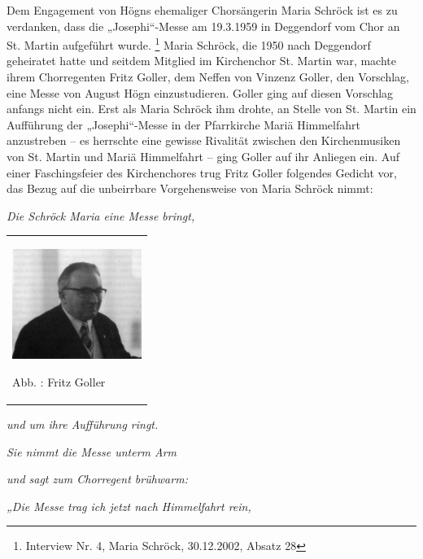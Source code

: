 \documentclass[a4paper]{article}
\newcommand\textstyleZitate[1]{\textit{#1}}
\newcounter{Abb}
\renewcommand\theAbb{\arabic{Abb}}
\begin{document}
Dem Engagement von Högns ehemaliger Chorsängerin Maria Schröck ist es zu
verdanken, dass die „Josephi“-Messe am 19.3.1959 in Deggendorf vom Chor
an St. Martin aufgeführt wurde. \footnote{Interview Nr. 4, Maria
Schröck, 30.12.2002, Absatz 28} Maria Schröck, die 1950 nach Deggendorf
geheiratet hatte und seitdem Mitglied im Kirchenchor St. Martin war,
machte ihrem Chorregenten Fritz Goller, dem Neffen von Vinzenz Goller,
den Vorschlag, eine Messe von August Högn einzustudieren. Goller ging
auf diesen Vorschlag anfangs nicht ein. Erst als Maria Schröck ihm
drohte, an Stelle von St. Martin ein Aufführung der „Josephi“-Messe in
der Pfarrkirche Mariä Himmelfahrt anzustreben – es herrschte eine
gewisse Rivalität zwischen den Kirchenmusiken von St. Martin und Mariä
Himmelfahrt – ging Goller auf ihr Anliegen ein. Auf einer
Faschingsfeier des Kirchenchores trug Fritz Goller folgendes Gedicht
vor, das Bezug auf die unbeirrbare Vorgehensweise von Maria Schröck
nimmt:

\textstyleZitate{Die Schröck Maria eine Messe bringt, }

\begin{center}
\begin{minipage}{4.598cm}
\begin{flushleft}
\tablefirsthead{}
\tablehead{}
\tabletail{}
\tablelasttail{}
\begin{supertabular}{m{4.3980002cm}}

\includegraphics[width=4.216cm,height=3.577cm]{pictures/zulassungsarbeit-img107.jpg}

Abb. \stepcounter{Abb}{\theAbb}: Fritz Goller \\
\end{supertabular}
\end{flushleft}
\end{minipage}
\end{center}
\textstyleZitate{und um ihre Aufführung ringt.}

\textstyleZitate{Sie nimmt die Messe unterm Arm}

\textstyleZitate{und sagt zum Chorregent brühwarm:}

\textstyleZitate{„Die Messe trag ich jetzt nach Himmelfahrt rein,}
\end{document}
